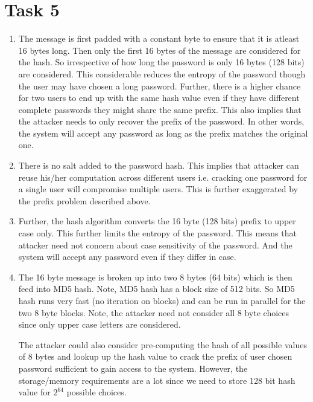 \documentclass{article}
\begin{document}
    \section*{Task 5}
    \begin{enumerate}
        \item The message is first padded with a constant byte to ensure that it is atleast 16 bytes long. Then only the first 16 bytes of the message are considered for the hash. So irrespective of how long the password is only 16 bytes (128 bits) are considered. This considerable reduces the entropy of the password though the user may have chosen a long password. Further, there is a higher chance for two users to end up with the same hash value even if they have different complete passwords they might share the same prefix. This also implies that the attacker needs to only recover the prefix of the password. In other words, the system will accept any password as long as the prefix matches the original one.

        \item There is no salt added to the password hash. This implies that attacker can reuse his/her computation across different users i.e. cracking one password for a single user will compromise multiple users. This is further exaggerated by the prefix problem described above.

        \item Further, the hash algorithm converts the 16 byte (128 bits) prefix to upper case only. This further limits the entropy of the password. This means that attacker need not concern about case sensitivity of the password. And the system will accept any password even if they differ in case.

        \item The 16 byte message is broken up into two 8 bytes (64 bits) which is then feed into MD5 hash. Note, MD5 hash has a block size of 512 bits. So MD5 hash runs very fast (no iteration on blocks) and can be run in parallel for the two 8 byte blocks. Note, the attacker need not consider all 8 byte choices since only upper case letters are considered.
        
        The attacker could also consider pre-computing the hash of all possible values of 8 bytes and lookup up the hash value to crack the prefix of user chosen password sufficient to gain access to the system. However, the storage/memory requirements are a lot since we need to store 128 bit hash value for $2^{64}$ possible choices.


\end{enumerate}
\end{document}
